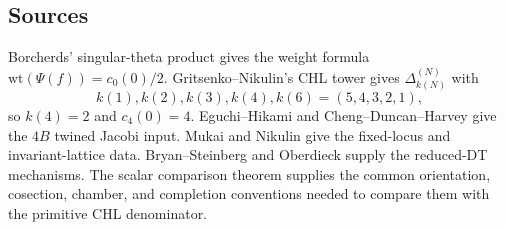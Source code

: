 \subsection*{Sources}

Borcherds' singular-theta product gives the weight formula
$\mathrm{wt}(\Psi(f))=c_0(0)/2$. Gritsenko--Nikulin's CHL tower gives
$\Delta^{(N)}_{k(N)}$ with
\[
  k(1),k(2),k(3),k(4),k(6)=(5,4,3,2,1),
\]
so $k(4)=2$ and $c_4(0)=4$. Eguchi--Hikami and
Cheng--Duncan--Harvey give the $4B$ twined Jacobi input. Mukai and
Nikulin give the fixed-locus and invariant-lattice data.
Bryan--Steinberg and Oberdieck supply the reduced-DT mechanisms. The
scalar comparison theorem supplies the common orientation, cosection,
chamber, and completion conventions needed to compare them with the
primitive CHL denominator.
